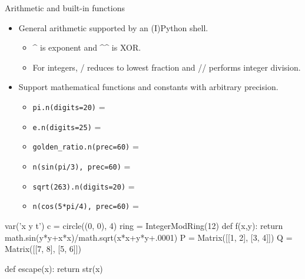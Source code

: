 \documentclass{beamer}
\begin{document}
\begin{frame}[fragile]{Arithmetic and built-in functions}
  \begin{itemize}
   \item General arithmetic supported by an (I)Python shell.
   \begin{itemize}
    \item \textasciicircum \hspace{0pt} is exponent and \textasciicircum\textasciicircum \hspace{0pt} is XOR.
    \item For integers, / reduces to lowest fraction and // performs integer division.
   \end{itemize}
   \item Support mathematical functions and constants with arbitrary precision.
   \begin{itemize}
    \item \verb+pi.n(digits=20)+ = 
    \item \verb+e.n(digits=25)+ = 
    \item \verb+golden_ratio.n(prec=60)+ = 
    \item \verb+n(sin(pi/3), prec=60)+ = 
    \item \verb+sqrt(263).n(digits=20)+ = 
    \item \verb+n(cos(5*pi/4), prec=60)+ = 
   \end{itemize}
  \end{itemize}
\end{frame}

\begin{sagesilent}
 var('x y t')
 c = circle((0, 0), 4)
 ring = IntegerModRing(12)
 def f(x,y):
  return math.sin(y*y+x*x)/math.sqrt(x*x+y*y+.0001)
 P = Matrix([[1, 2], [3, 4]])
 Q = Matrix([[7, 8], [5, 6]])
 
 def escape(x):
  return str(x)

\end{sagesilent}
\end{document}
